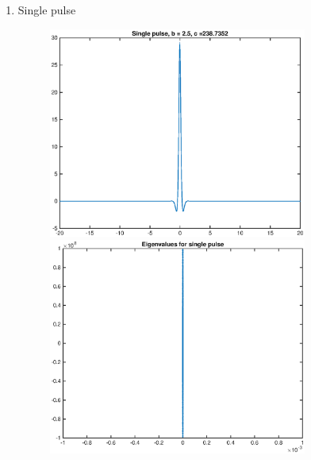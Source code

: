 \documentclass[12pt]{article}
\begin{document}
\begin{enumerate}
	\item Single pulse
	\begin{figure}[H]
	\includegraphics[width=8.5cm]{1single.eps}
	\includegraphics[width=8.5cm]{1singleeig.eps}
	\end{figure}
	


\end{enumerate}
\end{document}
